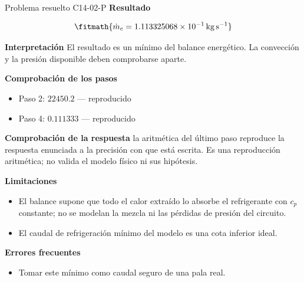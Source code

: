 \documentclass[10pt,openany]{book}
\begin{document}
\begin{studiumworked}{Problema resuelto C14-02-P}
\noindent\textbf{Resultado}

\[
\fitmath{\dot{m}_c=1.113325068\times10^{-1}\,\mathrm{kg}\,\mathrm{s}^{-1}}
\]

\noindent\textbf{Interpretación}
El resultado es un mínimo del balance energético. La convección y la presión disponible deben comprobarse aparte.

\noindent\textbf{Comprobación de los pasos}
\begin{itemize}
\item Paso 2: $22450.2$ — reproducido
\item Paso 4: $0.111333$ — reproducido
\end{itemize}

\noindent\textbf{Comprobación de la respuesta} la aritmética del último paso reproduce la respuesta enunciada a la precisión con que está escrita. Es una reproducción aritmética; no valida el modelo físico ni sus hipótesis.

\noindent\textbf{Limitaciones}
\begin{itemize}
\item El balance supone que todo el calor extraído lo absorbe el refrigerante con $c_p$ constante; no se modelan la mezcla ni las pérdidas de presión del circuito.
\item El caudal de refrigeración mínimo del modelo es una cota inferior ideal.
\end{itemize}

\noindent\textbf{Errores frecuentes}
\begin{itemize}
\item Tomar este mínimo como caudal seguro de una pala real.
\end{itemize}
\end{studiumworked}
\end{document}
